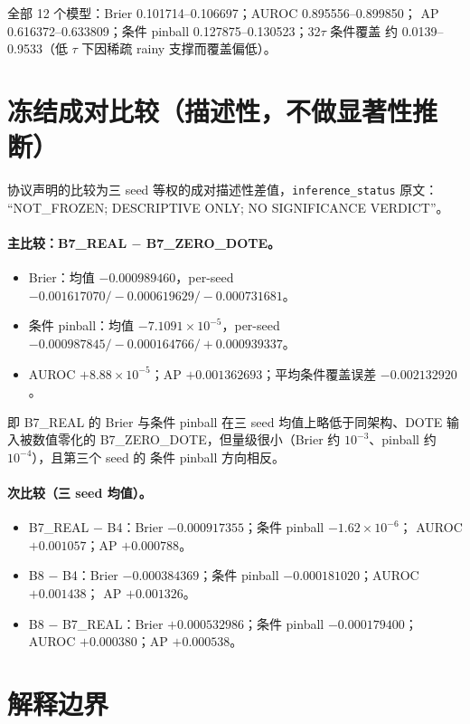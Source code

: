 \documentclass[UTF8,a4paper,fontset=windows,11pt]{ctexart}
\begin{document}
全部 12 个模型：Brier 0.101714--0.106697；AUROC 0.895556--0.899850；
AP 0.616372--0.633809；条件 pinball 0.127875--0.130523；32$\tau$ 条件覆盖
约 0.0139--0.9533（低 $\tau$ 下因稀疏 rainy 支撑而覆盖偏低）。

\section{冻结成对比较（描述性，不做显著性推断）}

协议声明的比较为三 seed 等权的成对描述性差值，\texttt{inference\_status} 原文：
``NOT\_FROZEN; DESCRIPTIVE ONLY; NO SIGNIFICANCE VERDICT''。

\paragraph{主比较：B7\_REAL $-$ B7\_ZERO\_DOTE。}
\begin{itemize}
\item Brier：均值 $-0.000989460$，per-seed $-0.001617070 / -0.000619629 / -0.000731681$。
\item 条件 pinball：均值 $-7.1091\times10^{-5}$，per-seed
$-0.000987845 / -0.000164766 / +0.000939337$。
\item AUROC $+8.88\times10^{-5}$；AP $+0.001362693$；平均条件覆盖误差 $-0.002132920$。
\end{itemize}
即 B7\_REAL 的 Brier 与条件 pinball 在三 seed 均值上略低于同架构、DOTE 输入被数值零化的
B7\_ZERO\_DOTE，但量级很小（Brier 约 $10^{-3}$、pinball 约 $10^{-4}$），且第三个 seed 的
条件 pinball 方向相反。

\paragraph{次比较（三 seed 均值）。}
\begin{itemize}
\item B7\_REAL $-$ B4：Brier $-0.000917355$；条件 pinball $-1.62\times10^{-6}$；
AUROC $+0.001057$；AP $+0.000788$。
\item B8 $-$ B4：Brier $-0.000384369$；条件 pinball $-0.000181020$；AUROC $+0.001438$；
AP $+0.001326$。
\item B8 $-$ B7\_REAL：Brier $+0.000532986$；条件 pinball $-0.000179400$；
AUROC $+0.000380$；AP $+0.000538$。
\end{itemize}

\section{解释边界}
\end{document}
